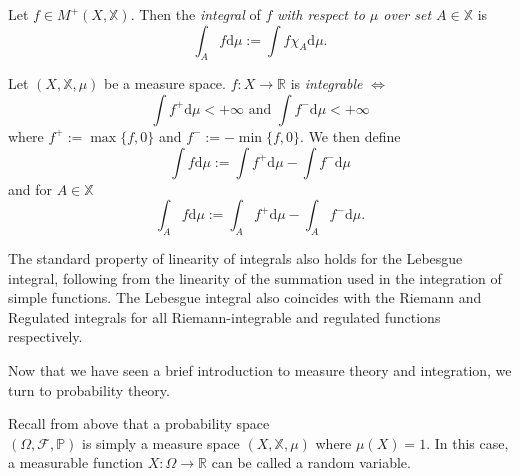 \begin{definition}
    Let $f\in M^+(X,\mathbb{X})$. Then the \emph{integral} of $f$
    \emph{with respect to $\mu$ over set $A\in \mathbb{X}$} is
    \begin{equation*}
        \int_A f\mathrm d\mu:=\int f\chi_A\mathrm d\mu.
    \end{equation*}
\end{definition}

\begin{definition}
    Let $(X,\mathbb{X},\mu)$ be a measure space. $f:X\rightarrow\mathbb{R}$
    is \emph{integrable} $\iff$
    \begin{equation*}
        \int f^+\mathrm d\mu<+\infty \textrm{ and }\int f^-\mathrm d\mu<+\infty
    \end{equation*}
    where $f^+:=\max\{f,0\}$ and $f^-:=-\min\{f,0\}$.
    We then define
    \begin{equation*}
        \int f\mathrm d\mu:=\int f^+\mathrm d\mu -\int f^-\mathrm d\mu
    \end{equation*}
    and for $A\in\mathbb{X}$
    \begin{equation*}
        \int_A f\mathrm d\mu:=\int_A f^+\mathrm d\mu -\int_A f^-\mathrm d\mu.
    \end{equation*}
\end{definition}

\begin{remark}
    The standard property of linearity of integrals also holds for the Lebesgue 
    integral, following from the linearity of the summation used in the integration of 
    simple functions. The Lebesgue integral also coincides with the Riemann
    and Regulated integrals for all Riemann-integrable and regulated functions respectively.
\end{remark}

Now that we have seen a brief introduction to measure theory and integration, we turn to 
probability theory.

\begin{definition}
    Recall from above that a probability space \\$(\Omega,\mathcal{F},\mathbb{P})$
    is simply a measure space $(X,\mathbb{X},\mu)$ where $\mu(X)=1.$ In this case,
    a measurable function $X:\Omega\rightarrow\mathbb{R}$ can be called
    a random variable. 
\end{definition}

